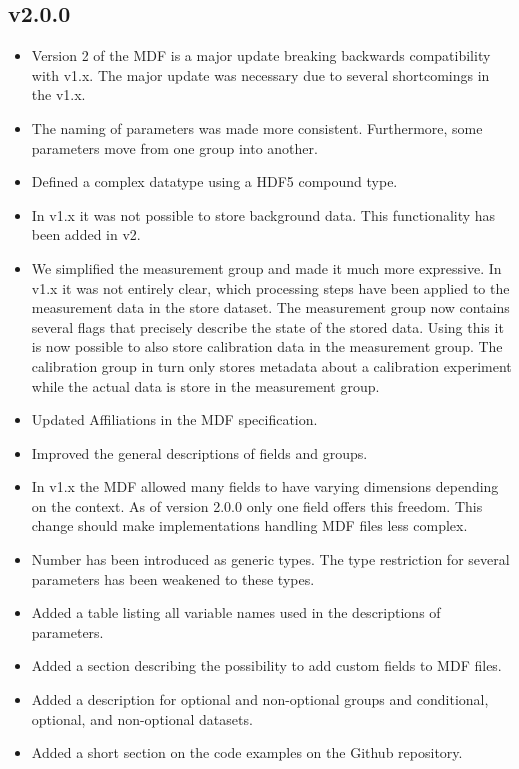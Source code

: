 \documentclass[landscape,a4paper]{article} %
\newcommand{\inlvar}[1]{{\ttfamily#1}}
\begin{document}
\begin{multicols}{2}
\subsection{v2.0.0}

\begin{itemize}
	\item Version 2 of the MDF is a major update breaking backwards compatibility with v1.x. The major update was necessary due to several shortcomings in the v1.x.
	\item The naming of parameters was made more consistent. Furthermore, some parameters move from one group into another.
	\item Defined a complex datatype using a HDF5 compound type. 
	\item In v1.x it was not possible to store background data. This functionality has been added in v2.
	\item We simplified the measurement group and made it much more expressive. In v1.x it was not entirely clear, which processing steps have been applied to the measurement data in the store dataset. The \inlvar{measurement} group now contains several flags that precisely describe the state of the stored data. Using this it is now possible to also store calibration data in the \inlvar{measurement} group. The calibration group in turn only stores metadata about a calibration experiment while the actual data is store in the measurement group.
	\item Updated Affiliations in the MDF specification.
	\item Improved the general descriptions of fields and groups.
	\item In v1.x the MDF allowed many fields to have varying dimensions depending on the context. As of version 2.0.0 only one field offers this freedom. This change should make implementations handling MDF files less complex.
	\item \inlvar{Number} has been introduced as generic types. The type restriction for several parameters has been weakened to these types.
	\item Added a table listing all variable names used in the descriptions of parameters.
	\item Added a section describing the possibility to add custom fields to MDF files.
	\item Added a description for optional and non-optional groups and conditional, optional, and non-optional datasets.
    \item Added a short section on the code examples on the Github repository.

\end{itemize}
\end{multicols}
\end{document}
